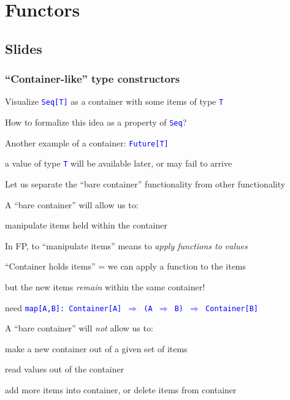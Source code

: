 
\chapter{Functors}

\section{Slides}

\subsection{``Container-like'' type constructors}

Visualize \texttt{\textcolor{blue}{\footnotesize{}Seq{[}T{]}}} as
a container with some items of type \texttt{\textcolor{blue}{\footnotesize{}T}}{\footnotesize\par}

How to formalize this idea as a property of \texttt{\textcolor{blue}{\footnotesize{}Seq}}?

Another example of a container: \texttt{\textcolor{blue}{\footnotesize{}Future{[}T{]}}}{\footnotesize\par}

a value of type \texttt{\textcolor{blue}{\footnotesize{}T}} will be
available later, or may fail to arrive

Let us separate the ``bare container'' functionality from other
functionality

A ``bare container'' will allow us to:

manipulate items held within the container

In FP, to ``manipulate items'' means to \emph{apply functions to
values}

``Container holds items'' = we can apply a function to the items

but the new items \emph{remain} within the same container!

need \texttt{\textcolor{blue}{\footnotesize{}map{[}A,B{]}:\ Container{[}A{]}
$\Rightarrow$ (A $\Rightarrow$ B) $\Rightarrow$ Container{[}B{]}}}{\footnotesize\par}

A ``bare container'' will \emph{not} allow us to:

make a new container out of a given set of items

read values out of the container

add more items into container, or delete items from container

